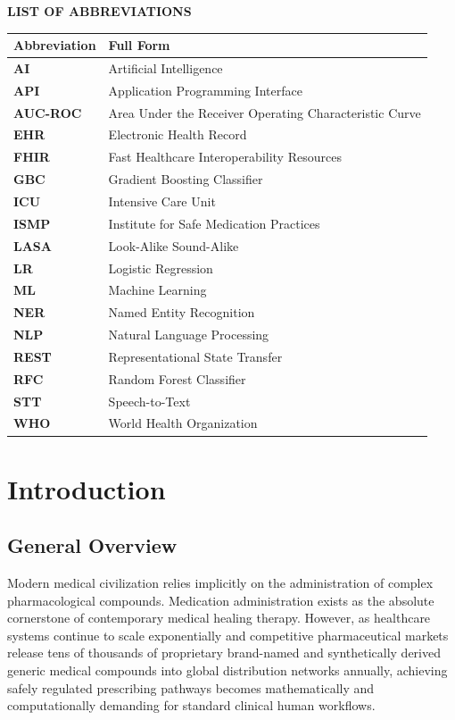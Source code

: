 \documentclass[12pt,a4paper]{report}
\begin{document}
\clearpage
\thispagestyle{plain}
\begin{center}
  {\Large\textbf{LIST OF ABBREVIATIONS}}
\end{center}
\vspace{16pt}

\begin{longtable}{>{\bfseries}p{3cm} p{10.5cm}}
\toprule
\textbf{Abbreviation} & \textbf{Full Form} \\
\midrule
\endhead
  \textbf{AI} & Artificial Intelligence\\[3pt]
  \textbf{API} & Application Programming Interface\\[3pt]
  \textbf{AUC-ROC} & Area Under the Receiver Operating Characteristic Curve\\[3pt]
  \textbf{EHR} & Electronic Health Record\\[3pt]
  \textbf{FHIR} & Fast Healthcare Interoperability Resources\\[3pt]
  \textbf{GBC} & Gradient Boosting Classifier\\[3pt]
  \textbf{ICU} & Intensive Care Unit\\[3pt]
  \textbf{ISMP} & Institute for Safe Medication Practices\\[3pt]
  \textbf{LASA} & Look-Alike Sound-Alike\\[3pt]
  \textbf{LR} & Logistic Regression\\[3pt]
  \textbf{ML} & Machine Learning\\[3pt]
  \textbf{NER} & Named Entity Recognition\\[3pt]
  \textbf{NLP} & Natural Language Processing\\[3pt]
  \textbf{REST} & Representational State Transfer\\[3pt]
  \textbf{RFC} & Random Forest Classifier\\[3pt]
  \textbf{STT} & Speech-to-Text\\[3pt]
  \textbf{WHO} & World Health Organization\\[3pt]
\bottomrule
\end{longtable}

\clearpage
{}
\setcounter{page}{1}

\chapter{Introduction}

\section{General Overview}
Modern medical civilization relies implicitly on the administration of complex pharmacological compounds. Medication administration exists as the absolute cornerstone of contemporary medical healing therapy. However, as healthcare systems continue to scale exponentially and competitive pharmaceutical markets release tens of thousands of proprietary brand-named and synthetically derived generic medical compounds into global distribution networks annually, achieving safely regulated prescribing pathways becomes mathematically and computationally demanding for standard clinical human workflows.
\end{document}
